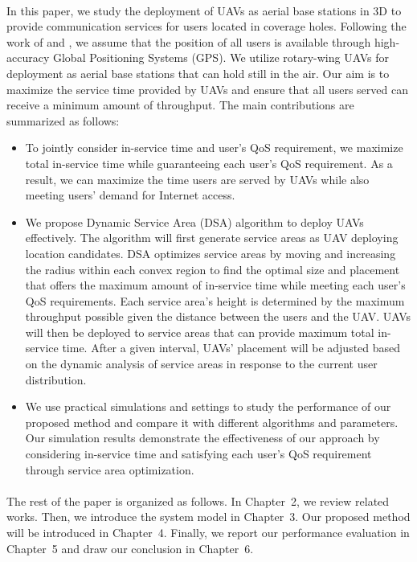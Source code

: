 \documentclass[a4paper,12pt]{report}
\begin{document}
\paragraph{}
In this paper, we study the deployment of UAVs as aerial base stations in 3D to provide communication services for users located in coverage holes. Following the work of \cite{b14} and \cite{b15}, we assume that the position of all users is available through high-accuracy Global Positioning Systems (GPS). We utilize rotary-wing UAVs for deployment as aerial base stations that can hold still in the air. Our aim is to maximize the service time provided by UAVs and ensure that all users served can receive a minimum amount of throughput. The main contributions are summarized as follows:
\begin{itemize}
    \item To jointly consider in-service time and user's QoS requirement, we maximize total in-service time while guaranteeing each user's QoS requirement. As a result, we can maximize the time users are served by UAVs while also meeting users' demand for Internet access.
    \item We propose Dynamic Service Area (DSA) algorithm to deploy UAVs effectively. The algorithm will first generate service areas as UAV deploying location candidates. DSA optimizes service areas by moving and increasing the radius within each convex region to find the optimal size and placement that offers the maximum amount of in-service time while meeting each user's QoS requirements. Each service area's height is determined by the maximum throughput possible given the distance between the users and the UAV. UAVs will then be deployed to service areas that can provide maximum total in-service time. After a given interval, UAVs' placement will be adjusted based on the dynamic analysis of service areas in response to the current user distribution.
    \item We use practical simulations and settings to study the performance of our proposed method and compare it with different algorithms and parameters. Our simulation results demonstrate the effectiveness of our approach by considering in-service time and satisfying each user's QoS requirement through service area optimization.
\end{itemize}
\paragraph{}
The rest of the paper is organized as follows. In Chapter~2, we review related works. Then, we introduce the system model in Chapter~3. Our proposed method will be introduced in Chapter~4. Finally, we report our performance evaluation in Chapter~5 and draw our conclusion in Chapter~6.
\end{document}
